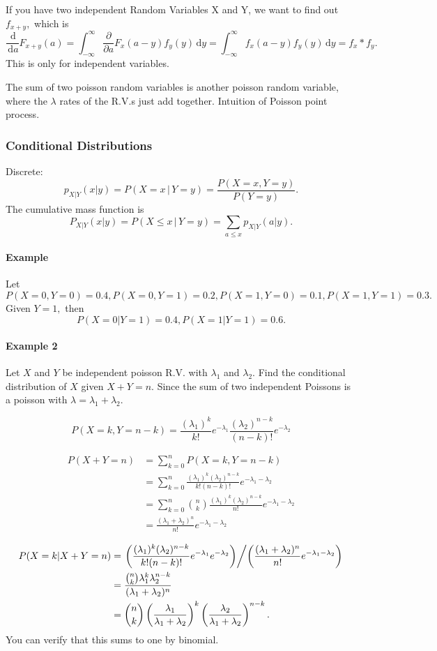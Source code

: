 \documentclass[12pt]{article}
\newcommand{\diffn}[1]{\,\mathrm{d}{#1}}
\begin{document}
If you have two independent Random Variables X and Y, we want to find out $f_{x+y},$ which is
\[\frac{\diffn{}}{\diffn{a}}F_{x+y}(a)=\int_{-\infty}^\infty\frac{\partial}{\partial a}F_x(a-y)f_y(y)\diffn{y}=\int_{-\infty}^\infty f_x(a-y)f_y(y)\diffn{y}=f_x\ast f_y.\] This is only for independent variables.

The sum of two poisson random variables is another poisson random variable, where the $\lambda$ rates of the R.V.s just add together. Intuition of Poisson point process.
\subsubsection{Conditional Distributions}
Discrete:
\[p_{X|Y}(x|y)=P(X=x\,|\,Y=y)=\frac{P(X=x,Y=y)}{P(Y=y)}.\] The cumulative mass function is
\[P_{X|Y}(x|y)=P(X\le x\,|\,Y=y)=\sum_{a\le x}p_{X|Y}(a|y).\]

\paragraph{Example}
Let
\[P(X=0,Y=0)=0.4,P(X=0,Y=1)=0.2,P(X=1,Y=0)=0.1,P(X=1,Y=1)=0.3.\]
Given $Y=1,$ then
\[P(X=0|Y=1)=0.4,P(X=1|Y=1)=0.6.\]

\paragraph{Example 2}
Let $X$ and $Y$ be independent poisson R.V. with $\lambda_1$ and $\lambda_2.$
Find the conditional distribution of $X$ given $X+Y=n.$ Since the sum of two independent Poissons is a poisson with $\lambda=\lambda_1+\lambda_2.$

\[P(X=k, Y=n-k) = \frac{(\lambda_1)^k}{k!} e^{-\lambda_1} \frac{(\lambda_2)^{n-k}}{(n-k)!} e^{-\lambda_2}\]

\begin{align*}P(X+Y=n) &= 
\sum_{k=0}^n P(X=k,Y=n-k) \\ &= \sum_{k=0}^n \frac{(\lambda_1)^k (\lambda_2)^{n-k}}{k!(n-k)!} e^{-\lambda_1-\lambda_2} \\&= \sum_{k=0}^n \binom{n}{k}\frac{(\lambda_1)^k (\lambda_2)^{n-k}}{n!}e^{-\lambda_1-\lambda_2} \\ &=
\frac{(\lambda_1+\lambda_2)^n}{n!}e^{-\lambda_1-\lambda_2}
\end{align*}

\begin{align*}P(X=k|X+Y=n)&=\left.\left(\frac{(\lambda_1)^k (\lambda_2)^{n-k}}{k! (n-k)!}e^{-\lambda_1}e^{-\lambda_2}\right)\middle/\left(\frac{(\lambda_1+\lambda_2)^n}{n!}e^{-\lambda_1-\lambda_2}\right) \right. \\ &=
\frac{\binom{n}{k}\lambda_1^k\lambda_2^{n-k}}{(\lambda_1+\lambda_2)^n}\\&=\binom{n}{k}\left(\frac{\lambda_1}{\lambda_1+\lambda_2}\right)^k\left(\frac{\lambda_2}{\lambda_1+\lambda_2}\right)^{n-k}.\end{align*}
You can verify that this sums to one by binomial.
\end{document}
